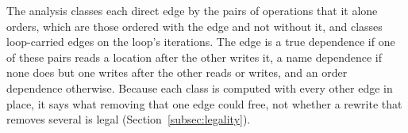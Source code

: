 The analysis classes each direct edge by the pairs of operations that it alone orders, which are those ordered with the edge and not without it, and classes loop-carried edges on the loop's iterations.
The edge is a true dependence if one of these pairs reads a location after the other writes it, a name dependence if none does but one writes after the other reads or writes, and an order dependence otherwise.
Because each class is computed with every other edge in place, it says what removing that one edge could free, not whether a rewrite that removes several is legal (Section~\ref{subsec:legality}).

